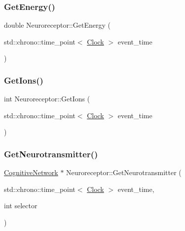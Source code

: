 \mbox{\label{classNeuroreceptor_abc151381ec5e7c39bb45f87a9fd17b9a}} 
\subsubsection{\texorpdfstring{Get\+Energy()}{GetEnergy()}}
{\footnotesize\ttfamily double Neuroreceptor\+::\+Get\+Energy (\begin{DoxyParamCaption}\item[{std\+::chrono\+::time\+\_\+point$<$ \mbox{\hyperlink{universe_8h_a0ef8d951d1ca5ab3cfaf7ab4c7a6fd80}{Clock}} $>$}]{event\+\_\+time }\end{DoxyParamCaption})\hspace{0.3cm}{\ttfamily [inline]}}

\mbox{\label{classNeuroreceptor_a69103180d9b335b9504b4ae3c203d0ea}} 
\subsubsection{\texorpdfstring{Get\+Ions()}{GetIons()}}
{\footnotesize\ttfamily int Neuroreceptor\+::\+Get\+Ions (\begin{DoxyParamCaption}\item[{std\+::chrono\+::time\+\_\+point$<$ \mbox{\hyperlink{universe_8h_a0ef8d951d1ca5ab3cfaf7ab4c7a6fd80}{Clock}} $>$}]{event\+\_\+time }\end{DoxyParamCaption})\hspace{0.3cm}{\ttfamily [inline]}}

\mbox{\label{classNeuroreceptor_a526d41738265399c19c67068db450851}} 
\subsubsection{\texorpdfstring{Get\+Neurotransmitter()}{GetNeurotransmitter()}}
{\footnotesize\ttfamily \mbox{\hyperlink{classCognitiveNetwork}{Cognitive\+Network}} $\ast$ Neuroreceptor\+::\+Get\+Neurotransmitter (\begin{DoxyParamCaption}\item[{std\+::chrono\+::time\+\_\+point$<$ \mbox{\hyperlink{universe_8h_a0ef8d951d1ca5ab3cfaf7ab4c7a6fd80}{Clock}} $>$}]{event\+\_\+time,  }\item[{int}]{selector }\end{DoxyParamCaption})}

